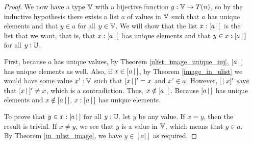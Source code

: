 \documentclass[../../math.tex]{subfiles}
\begin{document}
\begin{proof}
    We now have a type $\mathbb{V}$ with a bijective function $g : \mathbb{V} \to T(n)$, so by
    the inductive hypothesis there exists a list $a$ of values in $\mathbb{V}$ such that
    $a$ has unique elements and that $y \in a$ for all $y \in \mathbb{V}$.  We will show
    that the list $x : [ a\, |\,]$ is the list that we want, that is, that $x
    :[ a\, |\,]$ has unique elements and that $y \in x :[ a\, |\,]$ for all $y : \mathbb{U}$.

    First, because $a$ has unique values, by Theorem
    \ref{ulist_image_unique_inj}, $[ a\, |\,]$ has unique elements as well.  Also,
    if $x \in [ a\, |\,]$, by Theorem \ref{image_in_ulist} we would have some value
    $x' : \mathbb{V}$ such that $[ x\, |\,]' = x$ and $x' \in a$.  However, $[ \,|\, x ]'$ says
    that $[ x\, |\,]' \neq x$, which is a contradiction.  Thus, $x \notin [ a\, |\,]$.
    Because $[ a\, |\,]$ has unique elements and $x \notin [ a\, |\,]$, $x : [ a\, |\,]$ has
    unique elements.

    To prove that $y \in x : [ a\, |\,]$ for all $y : \mathbb{U}$, let $y$ be any value.  If
    $x = y$, then the result is trivial.  If $x \neq y$, we see that $y$ is a
    value in $\mathbb{V}$, which means that $y \in a$.  By Theorem \ref{in_ulist_image},
    we have $y \in [a|]$ as required.
\end{proof}
\end{document}
